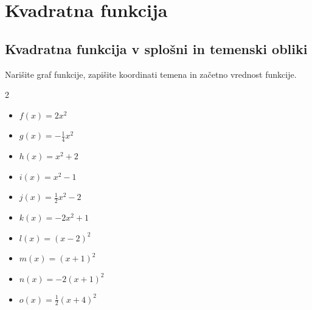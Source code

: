 \chapter{Kvadratna funkcija}

\section{Kvadratna funkcija v splošni in temenski obliki}


\newpage
    

        \begin{naloga}
            Narišite graf funkcije, zapišite koordinati temena in začetno vrednost funkcije.
            
            \begin{multicols}{2}
                
                \begin{itemize}
                    \item $ f(x)=2x^2 $ 
                    \item $ g(x)=-\frac{1}{4}x^2 $ 
                    \item $ h(x)=x^2+2 $ 
                    \item $ i(x)=x^2-1 $ 
                    \item $ j(x)=\frac{1}{2}x^2-2 $ 
                    \item $ k(x)=-2x^2+1 $
                    \item $ l(x)=\left(x-2\right)^2 $ 
                    \item $ m(x)=\left(x+1\right)^2 $ 
                    \item $ n(x)=-2\left(x+1\right)^2 $ 
                    \item $ o(x)=\frac{1}{2}\left(x+4\right)^2 $
                \end{itemize}
            \end{multicols}

        \end{naloga}
    

        
    

